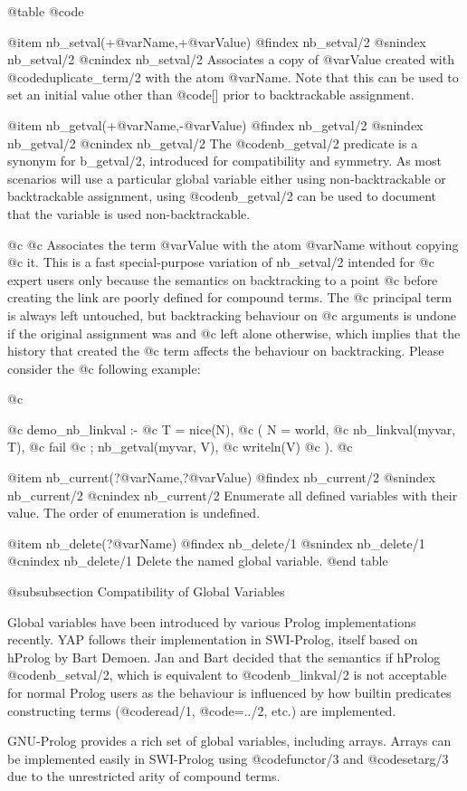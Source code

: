@table @code

@item nb_setval(+@var{Name},+@var{Value})
@findex nb_setval/2
@snindex nb_setval/2
@cnindex nb_setval/2
Associates a copy of @var{Value} created with @code{duplicate_term/2}
with the atom @var{Name}.  Note that this can be used to set an
initial value other than @code{[]} prior to backtrackable assignment.

@item nb_getval(+@var{Name},-@var{Value})
@findex nb_getval/2
@snindex nb_getval/2
@cnindex nb_getval/2
The @code{nb_getval/2} predicate is a synonym for b_getval/2, introduced for
compatibility and symmetry.  As most scenarios will use a particular
global variable either using non-backtrackable or backtrackable
assignment, using @code{nb_getval/2} can be used to document that the 
variable is used non-backtrackable.

@c     
@c Associates the term @var{Value} with the atom @var{Name} without copying
@c it. This is a fast special-purpose variation of nb_setval/2 intended for
@c expert users only because the semantics on backtracking to a point
@c before creating the link are poorly defined for compound terms. The
@c principal term is always left untouched, but backtracking behaviour on
@c arguments is undone if the original assignment was  and
@c left alone otherwise, which implies that the history that created the
@c term affects the behaviour on backtracking. Please consider the
@c following example:

@c \begin{code}
@c demo_nb_linkval :-
@c 	T = nice(N),
@c 	(   N = world,
@c 	    nb_linkval(myvar, T),
@c 	    fail
@c 	;   nb_getval(myvar, V),
@c 	    writeln(V)
@c 	).
@c \end{code}

@item nb_current(?@var{Name},?@var{Value})
@findex nb_current/2
@snindex nb_current/2
@cnindex nb_current/2
Enumerate all defined variables with their value. The order of
enumeration is undefined.

@item nb_delete(?@var{Name})
@findex nb_delete/1
@snindex nb_delete/1
@cnindex nb_delete/1
Delete the named global variable.
@end table

@subsubsection Compatibility of Global Variables

Global variables have been introduced by various Prolog
implementations recently.  YAP follows their implementation in SWI-Prolog, itself
based on hProlog by Bart Demoen. Jan and Bart
decided that the semantics if hProlog @code{nb_setval/2}, which is
equivalent to @code{nb_linkval/2} is not acceptable for normal Prolog
users as the behaviour is influenced by how builtin predicates
constructing terms (@code{read/1}, @code{=../2}, etc.) are implemented.

GNU-Prolog provides a rich set of global variables, including arrays.
Arrays can be implemented easily in SWI-Prolog using @code{functor/3} and
@code{setarg/3} due to the unrestricted arity of compound terms.


